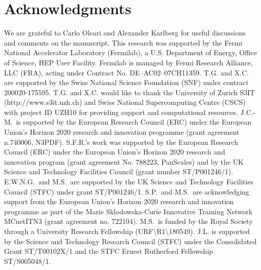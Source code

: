 \documentclass[10pt,prd,fleqn,superscriptaddress,notitlepage,nofootinbib,preprintnumbers,nobalancelastpage]{revtex4-1}
\begin{document}
\section{Acknowledgments}
\label{sec:acknowledgments}
We are grateful to Carlo Oleari and Alexander Karlberg for useful discussions and comments on the manuscript.
This research was supported by the Fermi National Accelerator Laboratory (Fermilab), a U.S. Department of Energy, Office of Science, HEP User Facility. Fermilab is managed by Fermi Research Alliance, LLC (FRA), acting under Contract No. DE--AC02--07CH11359. T.G. and X.C. are supported by the Swiss National Science Foundation (SNF) under contract 200020-175595.
T.G. and X.C. would like to thank the University of Zurich S3IT (http://www.s3it.uzh.ch) and Swiss National Supercomputing Centre (CSCS) with project ID UZH10 for providing support and computational resources.
J.C.-M.\ is supported by the European Research Council (ERC) under the European Union’s Horizon 2020 research and innovation programme (grant agreement n.740006, N3PDF).
S.F.R.’s work was supported by the
European Research Council (ERC) under the European Union’s Horizon 2020 research and innovation program (grant agreement No. 788223, PanScales) and by the UK Science and Technology Facilities Council (grant number ST/P001246/1).
E.W.N.G.\ and M.S.\ are supported by the UK Science and Technology Facilities Council
(STFC) under grant \linebreak ST/P001246/1.
S.P.\ and M.S.\ are acknowledging support from the European Union's Horizon 2020
research and innovation programme as part of the Marie Sklodowska-Curie Innovative
Training Network MCnetITN3 (grant agreement no. 722104).
M.S.\ is funded by the Royal Society through a University Research Fellowship
(URF\textbackslash{}R1\textbackslash{}180549).
J.L. is supported by the Science and Technology Research Council (STFC) under the Consolidated Grant ST/T00102X/1 and the STFC
Ernest Rutherford Fellowship ST/S005048/1.


\end{document}
